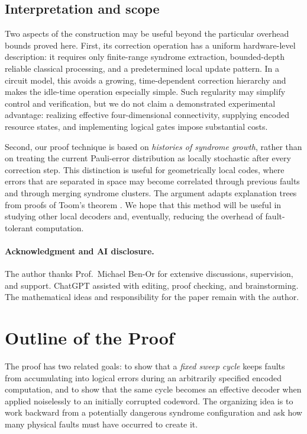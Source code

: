\subsection{Interpretation and scope}

Two aspects of the construction may be useful beyond the particular overhead bounds proved here.  First, its correction operation has a uniform hardware-level description: it requires only finite-range syndrome extraction, bounded-depth reliable classical processing, and a predetermined local update pattern.  In a circuit model, this avoids a growing, time-dependent correction hierarchy and makes the idle-time operation especially simple.  Such regularity may simplify control and verification, but we do not claim a demonstrated experimental advantage: realizing effective four-dimensional connectivity, supplying encoded resource states, and implementing logical gates impose substantial costs.

Second, our proof technique is based on \emph{histories of syndrome growth}, rather than on treating the current Pauli-error distribution as locally stochastic after every correction step.  This distinction is useful for geometrically local codes, where errors that are separated in space may become correlated through previous faults and through merging syndrome clusters.  The argument adapts explanation trees from proofs of Toom's theorem \cite{Berman,gacs2021newversiontoomsproof}.  We hope that this method will be useful in studying other local decoders and, eventually, reducing the overhead of fault-tolerant computation.

\paragraph{Acknowledgment and AI disclosure.}
The author thanks Prof.~Michael Ben-Or for extensive discussions, supervision, and support.  ChatGPT assisted with editing, proof checking, and brainstorming.  The mathematical ideas and responsibility for the paper remain with the author.

\section{Outline of the Proof}

The proof has two related goals: to show that a \emph{fixed sweep cycle} keeps faults from accumulating into logical errors during an arbitrarily specified encoded computation, and to show that the same cycle becomes an effective decoder when applied noiselessly to an initially corrupted codeword.  The organizing idea is to work backward from a potentially dangerous syndrome configuration and ask how many physical faults must have occurred to create it.

